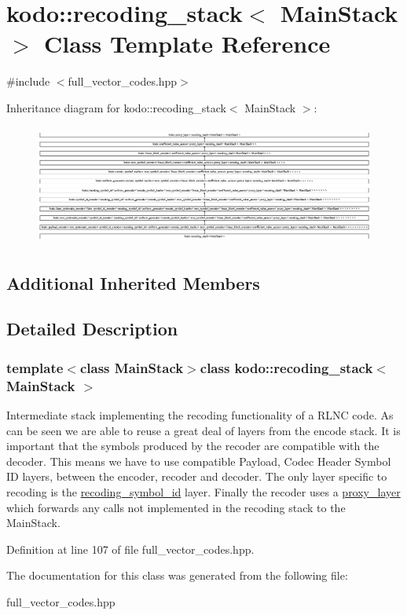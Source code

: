 \hypertarget{classkodo_1_1recoding__stack}{\section{kodo\-:\-:recoding\-\_\-stack$<$ Main\-Stack $>$ Class Template Reference}
\label{classkodo_1_1recoding__stack}
}


{\ttfamily \#include $<$full\-\_\-vector\-\_\-codes.\-hpp$>$}

Inheritance diagram for kodo\-:\-:recoding\-\_\-stack$<$ Main\-Stack $>$\-:\begin{figure}[H]
\begin{center}
\leavevmode
\includegraphics[height=3.973980cm]{classkodo_1_1recoding__stack}
\end{center}
\end{figure}
\subsection*{Additional Inherited Members}


\subsection{Detailed Description}
\subsubsection*{template$<$class Main\-Stack$>$class kodo\-::recoding\-\_\-stack$<$ Main\-Stack $>$}

Intermediate stack implementing the recoding functionality of a R\-L\-N\-C code. As can be seen we are able to reuse a great deal of layers from the encode stack. It is important that the symbols produced by the recoder are compatible with the decoder. This means we have to use compatible Payload, Codec Header Symbol I\-D layers, between the encoder, recoder and decoder. The only layer specific to recoding is the \hyperlink{classkodo_1_1recoding__symbol__id}{recoding\-\_\-symbol\-\_\-id} layer. Finally the recoder uses a \hyperlink{classkodo_1_1proxy__layer}{proxy\-\_\-layer} which forwards any calls not implemented in the recoding stack to the Main\-Stack. 

Definition at line 107 of file full\-\_\-vector\-\_\-codes.\-hpp.



The documentation for this class was generated from the following file\-:\begin{DoxyCompactItemize}
\item 
full\-\_\-vector\-\_\-codes.\-hpp\end{DoxyCompactItemize}
